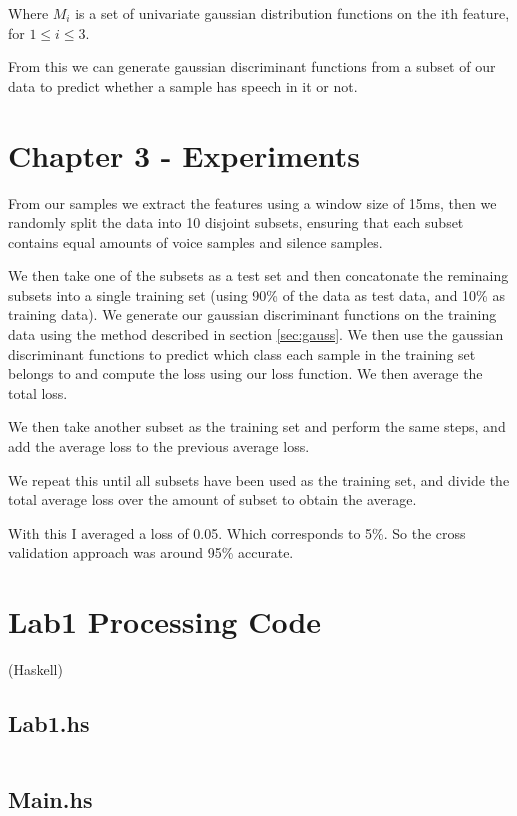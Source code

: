 \documentclass[a4paper]{article}
\begin{document}
Where $M_i$ is a set of univariate gaussian distribution functions on the ith feature,
for $ 1 \leq i \leq 3$.

From this we can generate gaussian discriminant functions from a subset of our data to
predict whether a sample has speech in it or not.


\section{Chapter 3 - Experiments}

From our samples we extract the features using a window size of 15ms, then we randomly
split the data into 10 disjoint subsets, ensuring that each subset contains equal amounts
of voice samples and silence samples. 

We then take one of the subsets as a test set and then 
concatonate the reminaing subsets into a single training set (using 90\% of the data
as test data, and 10\% as training data). We generate our gaussian discriminant functions
on the training data using the method described in section \ref{sec:gauss}. We then
use the gaussian discriminant functions to predict which class each sample in the training
set belongs to and compute the loss using our loss function. We then average the total
loss.

We then take another subset as the training set and perform the same steps, and add the average loss
to the previous average loss.

We repeat this until all subsets have been used as the training set, and divide the total average
loss over the amount of subset to obtain the average.

With this I averaged a loss of 0.05. Which corresponds to 5\%. So the cross validation
approach was around 95\% accurate.



\newpage

\appendix

\section{Lab1 Processing Code} (Haskell)

\subsection{Lab1.hs}
\inputminted{haskell}{../src/AI/Lab1/Lab1.hs}

\subsection{Main.hs}
\inputminted{haskell}{../src/AI/Lab1/Main.hs}
\end{document}
